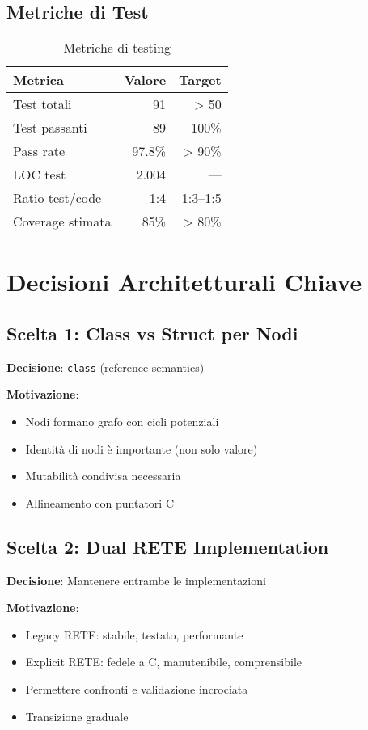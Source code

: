 \subsection{Metriche di Test}

\begin{table}[h]
\centering
\begin{tabular}{@{}lrr@{}}
\toprule
\textbf{Metrica} & \textbf{Valore} & \textbf{Target} \\
\midrule
Test totali & 91 & > 50 \\
Test passanti & 89 & 100\% \\
Pass rate & 97.8\% & > 90\% \\
LOC test & 2.004 & --- \\
Ratio test/code & 1:4 & 1:3--1:5 \\
Coverage stimata & 85\% & > 80\% \\
\bottomrule
\end{tabular}
\caption{Metriche di testing}
\label{tab:test_metrics}
\end{table}

\section{Decisioni Architetturali Chiave}

\subsection{Scelta 1: Class vs Struct per Nodi}

\textbf{Decisione}: \texttt{class} (reference semantics)

\textbf{Motivazione}:
\begin{itemize}
\item Nodi formano grafo con cicli potenziali
\item Identità di nodi è importante (non solo valore)
\item Mutabilità condivisa necessaria
\item Allineamento con puntatori C
\end{itemize}

\subsection{Scelta 2: Dual RETE Implementation}

\textbf{Decisione}: Mantenere entrambe le implementazioni

\textbf{Motivazione}:
\begin{itemize}
\item Legacy RETE: stabile, testato, performante
\item Explicit RETE: fedele a C, manutenibile, comprensibile
\item Permettere confronti e validazione incrociata
\item Transizione graduale
\end{itemize}

